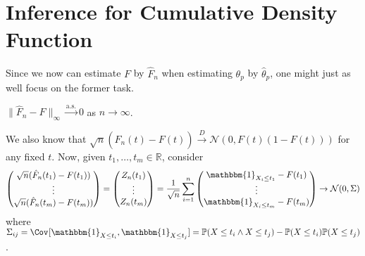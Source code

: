\section{Inference for Cumulative Density Function}
Since we now can estimate \(F\) by \(\hat{F} _n\) when estimating \(\theta _p\) by \(\hat{\theta} _p\), one might just as well focus on the former task.

\begin{theorem}\label{thm:Glivenk-Cantelli}
	\(\lVert \hat{F} _n - F \rVert _\infty \overset{\text{a.s.} }{\to} 0\) as \(n \to \infty \).
\end{theorem}

We also know that \(\sqrt{n} (\hat{F} _n(t) - F(t)) \overset{D}{\to} \mathcal{N} (0, F(t) (1 - F(t)))\) for any fixed \(t\). Now, given \(t_1, \dots , t_m \in \mathbb{R} \), consider
\[
	\begin{pmatrix}
		\sqrt{n} (\hat{F} _n(t_1) - F(t_1)) \\
		\vdots                              \\
		\sqrt{n} (\hat{F} _n(t_m) - F(t_m)) \\
	\end{pmatrix}
	= \begin{pmatrix}
		Z_n(t_1) \\
		\vdots   \\
		Z_n(t_m) \\
	\end{pmatrix}
	= \frac{1}{\sqrt{n} } \sum_{i=1}^{n} \begin{pmatrix}
		\mathbbm{1}_{X_i \leq t_1} - F(t_1) \\
		\vdots                              \\
		\mathbbm{1}_{X_i \leq t_m} - F(t_m) \\
	\end{pmatrix}
	\to \mathcal{N} (0, \Sigma )
\]
where \(\Sigma _{ij} = \Cov_{}[\mathbbm{1}_{X \leq t_i} , \mathbbm{1}_{X \leq t_j} ] = \mathbb{P} (X \leq t_i \land X \leq t_j) - \mathbb{P} (X \leq t_i) \mathbb{P} (X \leq t_j)\).